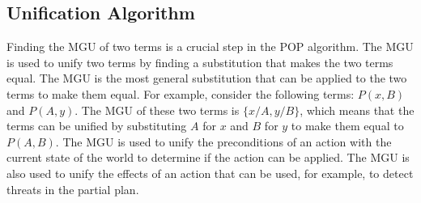 \subsection{Unification Algorithm} \label{subsec:unification_algorithm}
Finding the \acf{MGU} of two terms is a crucial step in the \ac{POP} algorithm. The \ac{MGU} is used to unify two terms by finding a substitution that makes the two terms equal. The \ac{MGU} is the most general substitution that can be applied to the two terms to make them equal.
For example, consider the following terms: $P(x, B)$ and $P(A, y)$. The \ac{MGU} of these two terms is $\{x/A, y/B\}$, which means that the terms can be unified by substituting $A$ for $x$ and $B$ for $y$ to make them equal to $P(A, B)$.
The \ac{MGU} is used to unify the preconditions of an action with the current state of the world to determine if the action can be applied. The \ac{MGU} is also used to unify the effects of an action that can be used, for example, to detect threats in the partial plan.

